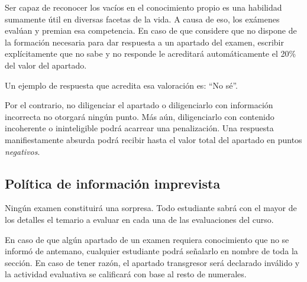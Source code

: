 Ser capaz de reconocer los vacíos en el conocimiento propio es una habilidad sumamente útil en diversas facetas de la vida. A causa de eso, los exámenes evalúan y premian esa competencia. En caso de que considere que no dispone de la formación necesaria para dar respuesta a un apartado del examen, escribir explícitamente que no sabe y no responde le acreditará automáticamente el 20\% del valor del apartado.

Un ejemplo de respuesta que acredita esa valoración es: ``No sé''.

Por el contrario, no diligenciar el apartado o diligenciarlo con información incorrecta no otorgará ningún punto. Más aún, diligenciarlo con contenido incoherente o ininteligible podrá acarrear una penalización. Una respuesta manifiestamente absurda podrá recibir hasta el valor total del apartado en puntos \emph{negativos}.

\subsection{Política de información imprevista}
Ningún examen constituirá una sorpresa. Todo estudiante sabrá con el mayor de los detalles el temario a evaluar en cada una de las evaluaciones del curso.

En caso de que algún apartado de un examen requiera conocimiento que no se informó de antemano, cualquier estudiante podrá señalarlo en nombre de toda la sección. En caso de tener razón, el apartado transgresor será declarado inválido y la actividad evaluativa se calificará con base al resto de numerales.
